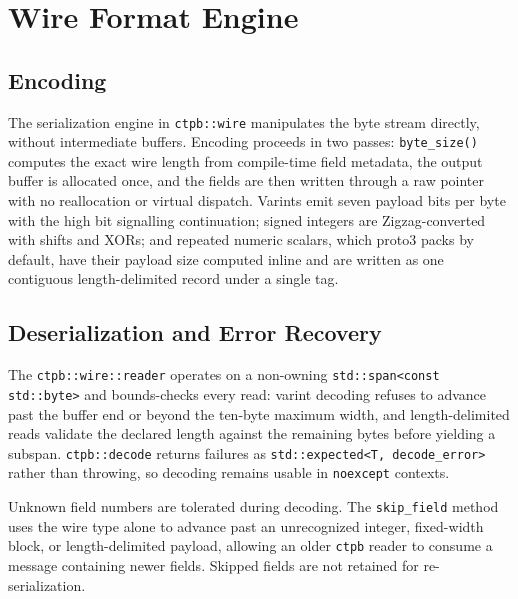 \section{Wire Format Engine}

\subsection{Encoding}
The serialization engine in \texttt{ctpb::wire} manipulates the byte stream directly, without intermediate buffers. Encoding proceeds in two passes: \texttt{byte\_size()} computes the exact wire length from compile-time field metadata, the output buffer is allocated once, and the fields are then written through a raw pointer with no reallocation or virtual dispatch. Varints emit seven payload bits per byte with the high bit signalling continuation; signed integers are Zigzag-converted with shifts and XORs; and repeated numeric scalars, which proto3 packs by default, have their payload size computed inline and are written as one contiguous length-delimited record under a single tag.

\subsection{Deserialization and Error Recovery}
The \texttt{ctpb::wire::reader} operates on a non-owning \texttt{std::span<const std::byte>} and bounds-checks every read: varint decoding refuses to advance past the buffer end or beyond the ten-byte maximum width, and length-delimited reads validate the declared length against the remaining bytes before yielding a subspan. \texttt{ctpb::decode} returns failures as \texttt{std::expected<T, decode\_error>} rather than throwing, so decoding remains usable in \texttt{noexcept} contexts.

Unknown field numbers are tolerated during decoding. The \texttt{skip\_field} method uses the wire type alone to advance past an unrecognized integer, fixed-width block, or length-delimited payload, allowing an older \texttt{ctpb} reader to consume a message containing newer fields. Skipped fields are not retained for re-serialization.
